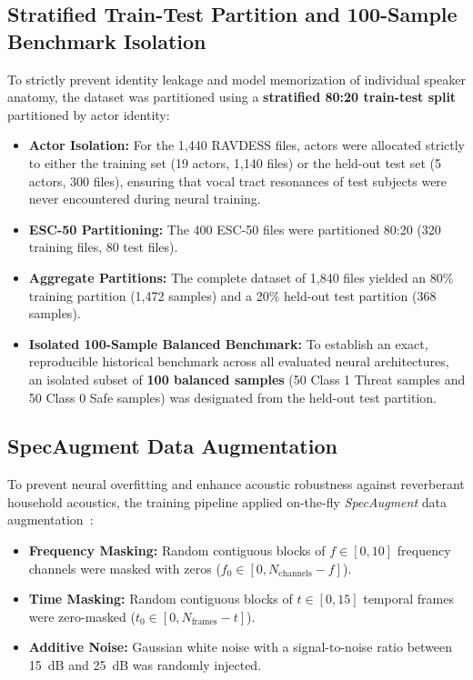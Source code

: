 \documentclass[12pt, a4paper]{report}
\begin{document}
\subsection{Stratified Train-Test Partition and 100-Sample Benchmark Isolation}
To strictly prevent identity leakage and model memorization of individual speaker anatomy, the dataset was partitioned using a \textbf{stratified 80:20 train-test split} partitioned by actor identity:
\begin{itemize}
    \item \textbf{Actor Isolation:} For the 1,440 RAVDESS files, actors were allocated strictly to either the training set (19 actors, 1,140 files) or the held-out test set (5 actors, 300 files), ensuring that vocal tract resonances of test subjects were never encountered during neural training.
    \item \textbf{ESC-50 Partitioning:} The 400 ESC-50 files were partitioned 80:20 (320 training files, 80 test files).
    \item \textbf{Aggregate Partitions:} The complete dataset of 1,840 files yielded an 80\% training partition (1,472 samples) and a 20\% held-out test partition (368 samples).
    \item \textbf{Isolated 100-Sample Balanced Benchmark:} To establish an exact, reproducible historical benchmark across all evaluated neural architectures, an isolated subset of \textbf{100 balanced samples} (50 Class 1 Threat samples and 50 Class 0 Safe samples) was designated from the held-out test partition.
\end{itemize}

\subsection{SpecAugment Data Augmentation}
To prevent neural overfitting and enhance acoustic robustness against reverberant household acoustics, the training pipeline applied on-the-fly \textit{SpecAugment} data augmentation~\cite{ref_park2019}:
\begin{itemize}
    \item \textbf{Frequency Masking:} Random contiguous blocks of $f \in [0, 10]$ frequency channels were masked with zeros ($f_0 \in [0, N_{\text{channels}} - f]$).
    \item \textbf{Time Masking:} Random contiguous blocks of $t \in [0, 15]$ temporal frames were zero-masked ($t_0 \in [0, N_{\text{frames}} - t]$).
    \item \textbf{Additive Noise:} Gaussian white noise with a signal-to-noise ratio between 15~dB and 25~dB was randomly injected.
\end{itemize}
\end{document}
